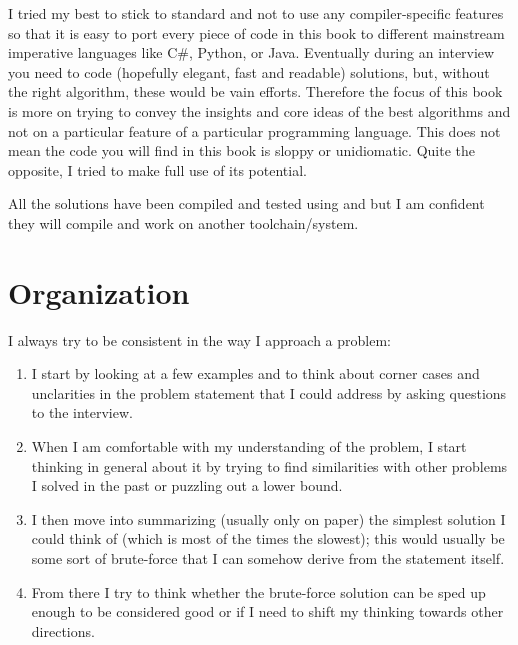 I tried my best to stick to standard \CC and not to use any compiler-specific features so that it is easy to port every piece of code in this book to different mainstream imperative languages like C\#, Python, or Java.  
Eventually during an interview you need to code (hopefully elegant, fast and readable) solutions, but, without the right algorithm, these would be vain efforts. Therefore the focus of this book is more on trying to convey the insights and core ideas of the best algorithms and not on a particular feature of a particular programming language.
This does not mean the code you will find in this book is sloppy or \CC unidiomatic. Quite the opposite, I tried to make full use of its potential.

All the solutions have been compiled and tested using  and  but I am confident they will compile and work on another toolchain/system. 

\section*{Organization}
I always try to be consistent in the way I approach a problem:
\begin{enumerate}
    \item I start by looking at a few examples and to think about corner cases and unclarities in the problem statement that I could address by asking questions to the interview.
    \item When I am comfortable with my understanding of the problem, I start thinking in general about it by trying to find similarities with other problems I solved in the past or puzzling out a lower bound.
    \item I then move into summarizing (usually only on paper) the simplest solution I could think of (which is most of the times the slowest); this would usually be some sort of brute-force that I can somehow derive from the statement itself.
    \item  From there I  try to think whether the brute-force solution can be sped up enough to be considered good or if I need to shift my thinking towards other directions.
\end{enumerate}


